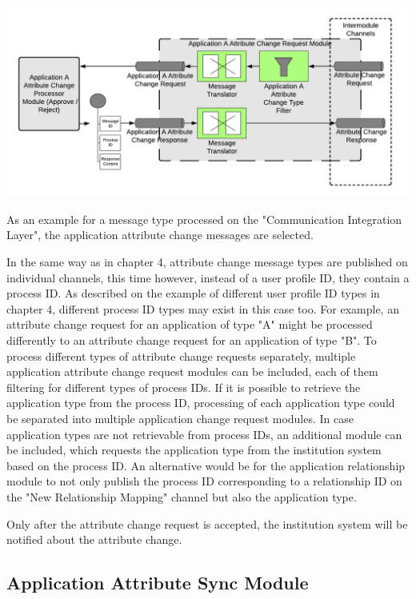 \begin{center}
    \includegraphics[scale=0.5]{Diagrams/Integration Architecture 2/Technological Integration/7. Application Attribute Change Request Module.pdf}
\end{center}

As an example for a message type processed on the "Communication Integration Layer", the application attribute change messages are selected.

In the same way as in chapter 4, attribute change message types are published on individual channels, this time however, instead of a user profile ID, they contain a process ID. As described on the example of different user profile ID types in chapter 4, different process ID types may exist in this case too. For example, an attribute change request for an application of type "A" might be processed differently to an attribute change request for an application of type "B". To process different types of attribute change requests separately, multiple application attribute change request modules can be included, each of them filtering for different types of process IDs. If it is possible to retrieve the application type from the process ID, processing of each application type could be separated into multiple application change request modules. In case application types are not retrievable from process IDs, an additional module can be included, which requests the application type from the institution system based on the process ID. An alternative would be for the application relationship module to not only publish the process ID corresponding to a relationship ID on the "New Relationship Mapping" channel but also the application type.

Only after the attribute change request is accepted, the institution system will be notified about the attribute change.

\subsection{Application Attribute Sync Module}

